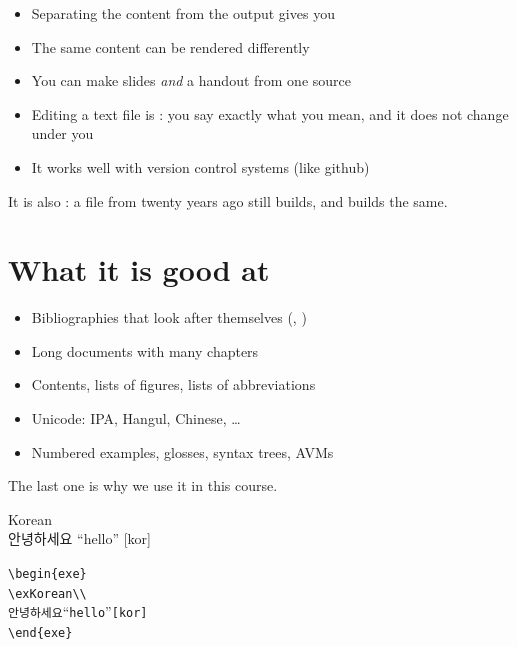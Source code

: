 \documentclass[a4paper,landscape,headrule,footrule]{foils}
\newcommand{\ko}[1]{{\korfont #1}}
\newcommand{\ipa}[1]{{\ipafont #1}}
\newenvironment{srcbox}
  {\begin{lrbox}{\srcb}\begin{minipage}{0.93\linewidth}\monouni\footnotesize}
  {\end{minipage}\end{lrbox}%
   \noindent\colorbox{black!5}{\usebox{\srcb}}}
\newcommand{\bs}{\textbackslash}
\begin{document}

\begin{itemize}
\item Separating the content from the output gives you 
\item The same content can be rendered differently
\item You can make slides \emph{and} a handout from one source
\item Editing a text file is : you say exactly what
  you mean, and it does not change under you
\item It works well with version control systems (like github)
\end{itemize}

\bigskip
It is also : a file from twenty years ago still builds, and
builds the same.

\section{What it is good at}


\begin{itemize}
\item Bibliographies that look after themselves (, )
\item Long documents with many chapters
\item Contents, lists of figures, lists of abbreviations
\item Unicode: IPA, Hangul, Chinese, \ldots
\item Numbered examples, glosses, syntax trees, AVMs
\end{itemize}

\bigskip
The last one is why we use it in this course.


\begin{exe}
\ex Korean \\
  \ko{안녕하세요} \ipa{[an̠ɲʌŋɦasʰejo]} ``hello'' [kor]
\end{exe}

\begin{srcbox}\begin{alltt}
\bs{}begin\{exe\}
\bs{}ex Korean \bs\bs
  \ko{안녕하세요} \ipa{[an̠ɲʌŋɦasʰejo]} ``hello'' [kor]
\bs{}end\{exe\}
\end{alltt}\end{srcbox}
\end{document}
